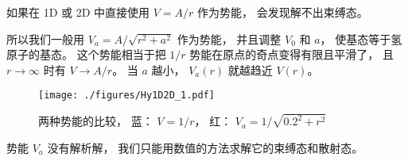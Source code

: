 

如果在 1D 或 2D 中直接使用 $V = A/r$ 作为势能， 会发现解不出束缚态。

所以我们一般用 $V_a = A/\sqrt{r^2 + a^2}$ 作为势能， 并且调整 $V_0$ 和 $a$， 使基态等于氢原子的基态。 这个势能相当于把 $1/r$ 势能在原点的奇点变得有限且平滑了， 且 $r\to\infty$ 时有 $V \to A/r$。 当 $a$ 越小， $V_a(r)$ 就越趋近 $V(r)$。

\begin{figure}[ht]
\centering
\texttt{[image: ./figures/Hy1D2D\_1.pdf]}
\caption{两种势能的比较， 蓝： $V = 1/r$， 红： $V_a = 1/\sqrt{0.2^2 + r^2}$} \label{Hy1D2D_fig1}
\end{figure}

势能 $V_a$ 没有解析解， 我们只能用数值的方法求解它的束缚态和散射态。
